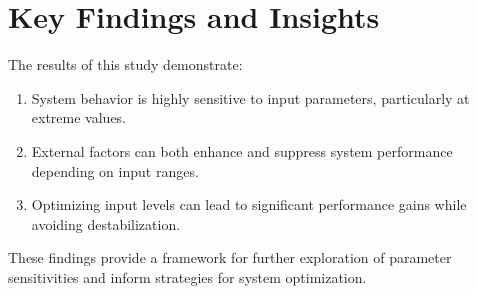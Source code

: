 
\section{Key Findings and Insights}
    The results of this study demonstrate:
    \begin{enumerate}
        \item System behavior is highly sensitive to input parameters, particularly at extreme values.
        \item External factors can both enhance and suppress system performance depending on input ranges.
        \item Optimizing input levels can lead to significant performance gains while avoiding destabilization.
    \end{enumerate}

    These findings provide a framework for further exploration of parameter sensitivities and inform strategies for system optimization.
